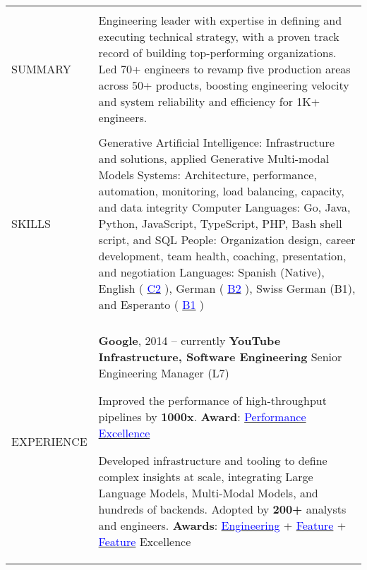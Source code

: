 \documentclass[letterpaper,10pt,oneside]{article}
\newcommand{\DatestampY}[1]{#1}
\newcommand{\itemspacing}{\vspace{0.10cm}}
\newcommand{\sref}[2]{%
    \href{https://0/local/attachments/#1}{\textcolor{blue}{#2}}%
}
\newenvironment{body}
{\par\par
\begin{longtable}{p{0.145\textwidth}p{0.81\textwidth}}}
{\par\end{longtable}\par}
\renewcommand{\section}[3]{\\[-0.35cm]\pdfbookmark[2]{#2}{#3}\\%
\raggedleft  %
{\fontsize{9.5pt}{9.5pt}\selectfont\bfseries\raggedright%
\MakeUppercase{#1}}&}
\begin{document}
\begin{body}


\section{Summary}{Summary}{PDF:Summary}

Engineering leader with expertise in defining and executing technical strategy, with a proven track record of building top-performing organizations. Led 70+ engineers to revamp five production areas across 50+ products, boosting engineering velocity and system reliability and efficiency for 1K+ engineers.


\section{Skills}{Skills}{PDF:Skills}
Generative Artificial Intelligence: Infrastructure and solutions, applied Generative Multi-modal Models\newline
Systems: Architecture, performance, automation, monitoring, load balancing, capacity, and data integrity\newline
Computer Languages: Go, Java, Python, JavaScript, TypeScript, PHP, Bash shell script, and SQL\newline
People: Organization design, career development, team health, coaching, presentation, and negotiation\newline
Languages: Spanish (Native), English (\sref{Diploma-ESOLCPE.pdf}{C2}), German (\sref{Diploma-GoetheDeutsch-B2.pdf}{B2}), Swiss German (B1), and Esperanto (\sref{Diploma-EAB-Esperanto-Meznivela.pdf}{B1})


\section{Experience}{Experience}{PDF:Experience}

\textbf{Google}, \DatestampY{2014} -- currently \vspace{0.06cm} \newline
\phantom{g}\textbf{YouTube Infrastructure, Software Engineering} \textemdash{ }Senior Engineering Manager (L7)
\begin{comp}
\item Improved the performance of high-throughput pipelines by \textbf{1000x}. \textbf{Award}: \sref{Google-Award-PerformanceExcellence.pdf}{Performance Excellence}
\item Developed infrastructure and tooling to define complex insights at scale, integrating Large Language Models, Multi-Modal Models, and hundreds of backends. Adopted by \textbf{200+} analysts and engineers. \textbf{Awards}: \sref{Award-EngineeringExcellenceImpact.pdf}{Engineering} + \sref{Google-Award-FeatureExcellence.pdf}{Feature} + \sref{Google-Award-FeatureExcellence2.pdf}{Feature} Excellence
\end{comp}
\itemspacing


\end{body}
\end{document}
